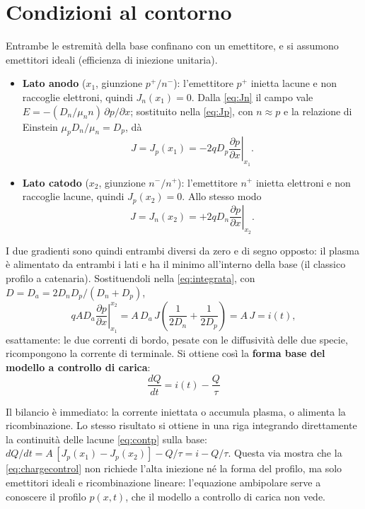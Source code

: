 \documentclass[11pt,a4paper]{article}
\newcommand{\dpar}[2]{\frac{\partial #1}{\partial #2}}
\begin{document}
\section{Condizioni al contorno}

Entrambe le estremit\`a della base confinano con un emettitore, e si assumono emettitori
ideali (efficienza di iniezione unitaria).

\begin{itemize}
  \item \textbf{Lato anodo} ($x_1$, giunzione $p^+/n^-$): l'emettitore $p^+$ inietta
        lacune e non raccoglie elettroni, quindi $J_n(x_1) = 0$. Dalla \eqref{eq:Jn}
        il campo vale $E = -(D_n/\mu_n n)\,\partial p/\partial x$; sostituito nella
        \eqref{eq:Jp}, con $n \approx p$ e la relazione di Einstein
        $\mu_p D_n/\mu_n = D_p$, d\`a
        \begin{equation}
          J = J_p(x_1) = -2qD_p \left.\dpar{p}{x}\right|_{x_1} .
        \end{equation}
  \item \textbf{Lato catodo} ($x_2$, giunzione $n^-/n^+$): l'emettitore $n^+$ inietta
        elettroni e non raccoglie lacune, quindi $J_p(x_2) = 0$. Allo stesso modo
        \begin{equation}
          J = J_n(x_2) = +2qD_n \left.\dpar{p}{x}\right|_{x_2} .
        \end{equation}
\end{itemize}
I due gradienti sono quindi entrambi diversi da zero e di segno opposto: il plasma
\`e alimentato da entrambi i lati e ha il minimo all'interno della base (il classico
profilo a catenaria). Sostituendoli nella \eqref{eq:integrata}, con
$D = D_a = 2D_nD_p/(D_n+D_p)$,
\begin{equation}
  qAD_a \left.\dpar{p}{x}\right|_{x_1}^{x_2}
  = A\,D_a\,J \left(\frac{1}{2D_n} + \frac{1}{2D_p}\right)
  = A\,J = i(t) ,
\end{equation}
esattamente: le due correnti di bordo, pesate con le diffusivit\`a delle due specie,
ricompongono la corrente di terminale. Si ottiene cos\`i la \textbf{forma base del
modello a controllo di carica}:
\begin{equation}
  \boxed{\;
  \frac{dQ}{dt} = i(t) - \frac{Q}{\tau}
  \;}
  \label{eq:chargecontrol}
\end{equation}

Il bilancio \`e immediato: la corrente iniettata o accumula plasma, o alimenta la
ricombinazione. Lo stesso risultato si ottiene in una riga integrando direttamente
la continuit\`a delle lacune \eqref{eq:contp} sulla base:
$dQ/dt = A\,[J_p(x_1) - J_p(x_2)] - Q/\tau = i - Q/\tau$. Questa via mostra che la
\eqref{eq:chargecontrol} non richiede l'alta iniezione n\'e la forma del profilo, ma
solo emettitori ideali e ricombinazione lineare: l'equazione ambipolare serve a
conoscere il profilo $p(x,t)$, che il modello a controllo di carica non vede.
\end{document}
